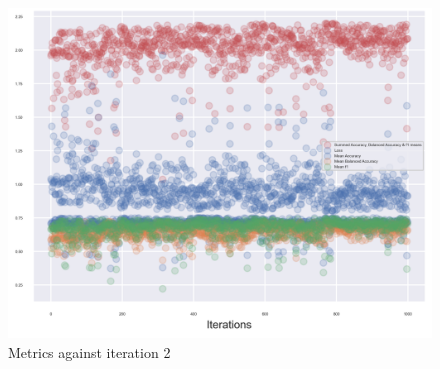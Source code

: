 \documentclass[11pt, a4paper]{article}
\begin{document}
\begin{multicols}{2}
\centering
\begin{figure}[H]
	\vspace{-0.4cm}
	\includegraphics[width=\linewidth]{Accuracy_against_iteration2.png} 
	\caption{Metrics against iteration 2}
	\label{fig:Acc2}
\end{figure}

\end{multicols}
\end{document}
